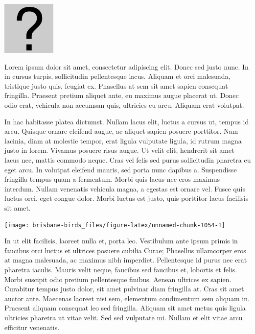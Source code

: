 \documentclass[]{book}
\let\origfigure\figure
\let\endorigfigure\endfigure
\renewenvironment{figure}[1][2] {
  \expandafter\origfigure\expandafter[H]
} {
  \endorigfigure
}
\begin{document}
\begin{figure}
\centering
\includegraphics{assets/missing.png}
\caption{No image for species}
\end{figure}

Lorem ipsum dolor sit amet, consectetur adipiscing elit. Donec sed justo
nunc. In in cursus turpis, sollicitudin pellentesque lacus. Aliquam et
orci malesuada, tristique justo quis, feugiat ex. Phasellus at sem sit
amet sapien consequat fringilla. Praesent pretium aliquet ante, eu
maximus augue placerat ut. Donec odio erat, vehicula non accumsan quis,
ultricies eu arcu. Aliquam erat volutpat.

In hac habitasse platea dictumst. Nullam lacus elit, luctus a cursus ut,
tempus id arcu. Quisque ornare eleifend augue, ac aliquet sapien posuere
porttitor. Nam lacinia, diam at molestie tempor, erat ligula vulputate
ligula, id rutrum magna justo in lorem. Vivamus posuere risus augue. Ut
velit elit, hendrerit sit amet lacus nec, mattis commodo neque. Cras vel
felis sed purus sollicitudin pharetra eu eget arcu. In volutpat eleifend
mauris, sed porta nunc dapibus a. Suspendisse fringilla tempus quam a
fermentum. Morbi quis lacus nec eros maximus interdum. Nullam venenatis
vehicula magna, a egestas est ornare vel. Fusce quis luctus orci, eget
congue dolor. Morbi luctus est justo, quis porttitor lacus facilisis sit
amet.

\begin{figure}
\texttt{[image: brisbane-birds\_files/figure-latex/unnamed-chunk-1054-1]} \caption{insert figure caption}\label{fig:unnamed-chunk-1054}
\end{figure}

In ut elit facilisis, laoreet nulla et, porta leo. Vestibulum ante ipsum
primis in faucibus orci luctus et ultrices posuere cubilia Curae;
Phasellus ullamcorper eros at magna malesuada, ac maximus nibh
imperdiet. Pellentesque id purus nec erat pharetra iaculis. Mauris velit
neque, faucibus sed faucibus et, lobortis et felis. Morbi suscipit odio
pretium pellentesque finibus. Aenean ultrices ex sapien. Curabitur
tempus justo dolor, sit amet pulvinar diam fringilla at. Cras sit amet
auctor ante. Maecenas laoreet nisi sem, elementum condimentum sem
aliquam in. Praesent aliquam consequat leo sed fringilla. Aliquam sit
amet metus quis ligula ultricies pharetra ut vitae velit. Sed sed
vulputate mi. Nullam et elit vitae arcu efficitur venenatis.
\end{document}
